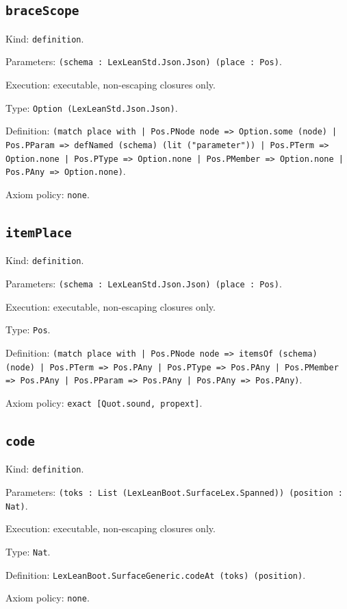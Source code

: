 \documentclass[11pt]{article}
\begin{document}
\subsection*{\texttt{braceScope}}
\noindent Kind: \texttt{definition}.\par
\noindent Parameters: \texttt{(schema : LexLeanStd.Json.Json) (place : Pos)}.\par
\noindent Execution: executable, non-escaping closures only.\par
\noindent Type: \texttt{Option (LexLeanStd.Json.Json)}.\par
\noindent Definition: \texttt{(match place with | Pos.PNode node => Option.some (node) | Pos.PParam => defNamed (schema) (lit ("parameter")) | Pos.PTerm => Option.none | Pos.PType => Option.none | Pos.PMember => Option.none | Pos.PAny => Option.none)}.\par
\noindent Axiom policy: \texttt{none}.\par
\subsection*{\texttt{itemPlace}}
\noindent Kind: \texttt{definition}.\par
\noindent Parameters: \texttt{(schema : LexLeanStd.Json.Json) (place : Pos)}.\par
\noindent Execution: executable, non-escaping closures only.\par
\noindent Type: \texttt{Pos}.\par
\noindent Definition: \texttt{(match place with | Pos.PNode node => itemsOf (schema) (node) | Pos.PTerm => Pos.PAny | Pos.PType => Pos.PAny | Pos.PMember => Pos.PAny | Pos.PParam => Pos.PAny | Pos.PAny => Pos.PAny)}.\par
\noindent Axiom policy: \texttt{exact [Quot.sound, propext]}.\par
\subsection*{\texttt{code}}
\noindent Kind: \texttt{definition}.\par
\noindent Parameters: \texttt{(toks : List (LexLeanBoot.SurfaceLex.Spanned)) (position : Nat)}.\par
\noindent Execution: executable, non-escaping closures only.\par
\noindent Type: \texttt{Nat}.\par
\noindent Definition: \texttt{LexLeanBoot.SurfaceGeneric.codeAt (toks) (position)}.\par
\noindent Axiom policy: \texttt{none}.\par
\end{document}
